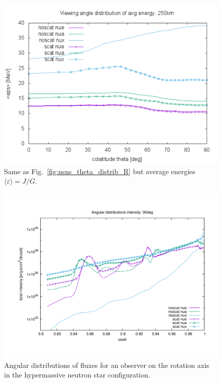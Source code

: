 \documentclass[aps,floatfix,prd,superscriptaddress,twocolumn]{revtex4-1}
\begin{document}
\begin{figure}
  \includegraphics[width=\columnwidth]{theta_distrib-250km-avg_eps}
  \caption{Same as Fig.~\ref{fig:nsns_theta_distrib_R} but
    average energies $\langle \varepsilon \rangle = J/G$.}
  \label{fig:nsns_theta_distrib_avg_eps}
\end{figure}

\begin{figure}
  \includegraphics[width=\columnwidth]{cosA_distrib-intensity-250km-00deg}
  \caption{Angular distributions of fluxes for an observer on the rotation axis
    in the hypermassive neutron star configuration.}
  \label{fig:nsns_cosA_distrib_I_00deg}
\end{figure}
\end{document}
